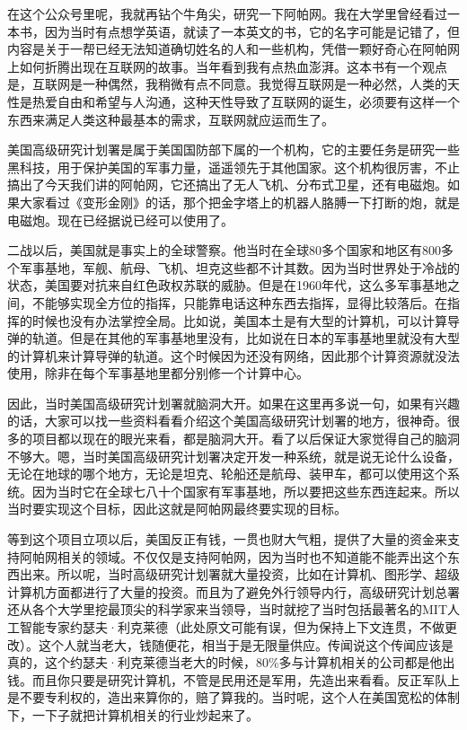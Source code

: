 \documentclass[
  letterpaper,
  DIV=11,
  numbers=noendperiod]{scrreprt}
\begin{document}
在这个公众号里呢，我就再钻个牛角尖，研究一下阿帕网。我在大学里曾经看过一本书，因为当时有点想学英语，就读了一本英文的书，它的名字可能是记错了，但内容是关于一帮已经无法知道确切姓名的人和一些机构，凭借一颗好奇心在阿帕网上如何折腾出现在互联网的故事。当年看到我有点热血澎湃。这本书有一个观点是，互联网是一种偶然，我稍微有点不同意。我觉得互联网是一种必然，人类的天性是热爱自由和希望与人沟通，这种天性导致了互联网的诞生，必须要有这样一个东西来满足人类这种最基本的需求，互联网就应运而生了。

美国高级研究计划署是属于美国国防部下属的一个机构，它的主要任务是研究一些黑科技，用于保护美国的军事力量，遥遥领先于其他国家。这个机构很厉害，不止搞出了今天我们讲的阿帕网，它还搞出了无人飞机、分布式卫星，还有电磁炮。如果大家看过《变形金刚》的话，那个把金字塔上的机器人胳膊一下打断的炮，就是电磁炮。现在已经据说已经可以使用了。

二战以后，美国就是事实上的全球警察。他当时在全球80多个国家和地区有800多个军事基地，军舰、航母、飞机、坦克这些都不计其数。因为当时世界处于冷战的状态，美国要对抗来自红色政权苏联的威胁。但是在1960年代，这么多军事基地之间，不能够实现全方位的指挥，只能靠电话这种东西去指挥，显得比较落后。在指挥的时候也没有办法掌控全局。比如说，美国本土是有大型的计算机，可以计算导弹的轨道。但是在其他的军事基地里没有，比如说在日本的军事基地里就没有大型的计算机来计算导弹的轨道。这个时候因为还没有网络，因此那个计算资源就没法使用，除非在每个军事基地里都分别修一个计算中心。

因此，当时美国高级研究计划署就脑洞大开。如果在这里再多说一句，如果有兴趣的话，大家可以找一些资料看看介绍这个美国高级研究计划署的地方，很神奇。很多的项目都以现在的眼光来看，都是脑洞大开。看了以后保证大家觉得自己的脑洞不够大。嗯，当时美国高级研究计划署决定开发一种系统，就是说无论什么设备，无论在地球的哪个地方，无论是坦克、轮船还是航母、装甲车，都可以使用这个系统。因为当时它在全球七八十个国家有军事基地，所以要把这些东西连起来。所以当时要实现这个目标，因此这就是阿帕网最终要实现的目标。

等到这个项目立项以后，美国反正有钱，一贯也财大气粗，提供了大量的资金来支持阿帕网相关的领域。不仅仅是支持阿帕网，因为当时也不知道能不能弄出这个东西出来。所以呢，当时高级研究计划署就大量投资，比如在计算机、图形学、超级计算机方面都进行了大量的投资。而且为了避免外行领导内行，高级研究计划总署还从各个大学里挖最顶尖的科学家来当领导，当时就挖了当时包括最著名的MIT人工智能专家约瑟夫·利克莱德（此处原文可能有误，但为保持上下文连贯，不做更改）。这个人就当老大，钱随便花，相当于是无限量供应。传闻说这个传闻应该是真的，这个约瑟夫·利克莱德当老大的时候，80\%多与计算机相关的公司都是他出钱。而且你只要是研究计算机，不管是民用还是军用，先造出来看看。反正军队上是不要专利权的，造出来算你的，赔了算我的。当时呢，这个人在美国宽松的体制下，一下子就把计算机相关的行业炒起来了。
\end{document}
